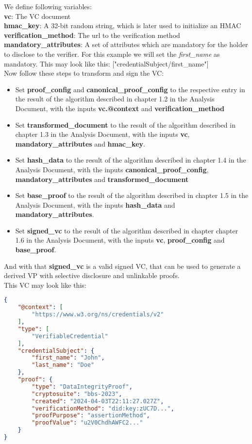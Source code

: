 \documentclass[
	a4paper               %
	,bibliography=totoc   %
	,listof=totoc         %
	,monolingual
]{bfhthesis}              %
\begin{document}
We define following variables:\\
\textbf{vc}: The VC document\\
\textbf{hmac\_key}: A 32-bit random string, which is later used to initialize an HMAC\\
\textbf{verification\_method}: The url to the verification method\\
\textbf{mandatory\_attributes}: A set of attributes which are mandatory for the holder to disclose to the verifier. For this example we will set the \textit{first\_name} as mandatory. This may look like this: ["credentialSubject/first\_name"]\\

Now follow these steps to transform and sign the VC:
\begin{itemize}
	\item Set \textbf{proof\_config} and \textbf{canonical\_proof\_config} to the respective entry in the result of the algorithm described in chapter 1.2 in the Analysis Document, with the inputs \textbf{vc.@context} and \textbf{verification\_method}
	\item Set \textbf{transformed\_document} to the result of the algorithm described in chapter 1.3 in the Analysis Document, with the inputs \textbf{vc}, \textbf{mandatory\_attributes} and \textbf{hmac\_key}.
	\item Set \textbf{hash\_data} to the result of the algorithm described in chapter 1.4 in the Analysis Document, with the inputs \textbf{canonical\_proof\_config}, \textbf{mandatory\_attributes} and \textbf{transformed\_document}
	\item Set \textbf{base\_proof} to the result of the algorithm described in chapter 1.5 in the Analysis Document, with the inputs \textbf{hash\_data} and \textbf{mandatory\_attributes}.
	\item Set \textbf{signed\_vc} to the result of the algorithm described in chapter chapter 1.6 in the Analysis Document, with the inputs \textbf{vc}, \textbf{proof\_config} and \textbf{base\_proof}.
\end{itemize}

And with that \textbf{signed\_vc} is a valid signed VC, that can be used to generate a derived VP with selective disclosure and unlinkable proofs.\\

This VC may look like this:

\begin{lstlisting}[language=json,firstnumber=1,caption={Signed VC},captionpos=b]
{
	"@context": [
		"https://www.w3.org/ns/credentials/v2"
	],
	"type": [
		"VerifiableCredential"
	],
	"credentialSubject": {
		"first_name": "John",
		"last_name": "Doe"
	},
	"proof": {
		"type": "DataIntegrityProof",
		"cryptosuite": "bbs-2023",
		"created": "2024-04-03T22:11:27.027Z",
		"verificationMethod": "did:key:zUC7D...",
		"proofPurpose": "assertionMethod",
		"proofValue": "u2V0ChdhAWFC2..."
	}
}
\end{lstlisting}
\end{document}
